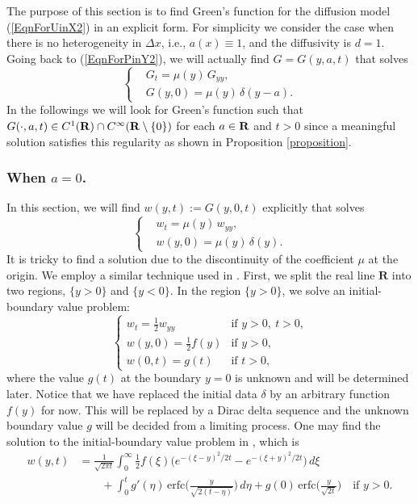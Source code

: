 \documentclass[11pt]{amsart}
\def\R{{\bf R}}
\def\d{d}
\def\R{{\bf R}}
\def\bfR{{\bf R}}
\def\erfc{\mathrm{erfc}}
\begin{document}
The purpose of this section is to find Green's function for the diffusion model (\ref{EqnForUinX2}) in an explicit form. For simplicity we consider the case when there is no heterogeneity in $\Delta x$, i.e., $a(x)\equiv 1$, and the diffusivity is $\d=1$. Going back to (\ref{EqnForPinY2}), we will actually find  $G=G(y,a,t)$ that solves
\[\left\{
\begin{aligned}
&G_t= \mu(y) \,G_{yy},\\
&G(y,0)=\mu(y) \,\delta(y-a).
\end{aligned}
\right.\]
In the followings we will look for Green's function such that $G(\cdot,a,t)\in C^1(\R)\cap C^\infty(\R\setminus\{0\})$ for each $a\in\bfR$ and $t>0$ since a meaningful solution satisfies this regularity as shown in Proposition \ref{proposition}.


\subsubsection{When $a=0$.}
In this section, we will find $w(y,t):=G(y,0,t)$ explicitly that solves
\begin{equation}\label{w0}
\left\{
\begin{aligned}
&w_t= \mu(y) \,w_{yy},\\
&w(y,0)=\mu(y) \,\delta(y).
\end{aligned}
\right.
\end{equation}
It is tricky to find a solution due to the discontinuity of the coefficient $\mu$ at the origin. We employ a similar technique used in \cite{Chung20142520}. First, we split the real line $\textbf{R}$ into two regions, $\{ y>0 \}$ and $\{ y<0 \}$. In the region $\{y>0\}$, we solve an initial-boundary value problem:
\[
\begin{cases}
w_t = \frac{1}{2} w_{yy} & \text{if $y > 0, ~t > 0$,} \\
w(y,0) = \frac{1}{2} f(y) & \text{if $y > 0$,} \\
w(0,t) = g(t) & \text{if $t > 0$,}
\end{cases}
\]
where the value $g(t)$ at the boundary $y=0$ is unknown and will be determined later. Notice that we have replaced the initial data $\delta$ by an arbitrary function $f(y)$ for now. This will be replaced by a Dirac delta sequence and the unknown boundary value $g$ will be decided from a limiting process. One may find the solution to the initial-boundary value problem in \cite[p18 and p22]{MR1728947}, which is
\[ \begin{split}
w(y,t) &= \frac{1}{\sqrt{2 \pi t}} \int_0^\infty \frac{1}{2} f(\xi) \big( e^{-(\xi-y)^2/2t} - e^{-(\xi+y)^2/2t} \big)\,d\xi \\
& \qquad + \int_0^t g'(\eta) \,\erfc\Big( \frac{y}{\sqrt{2(t-\eta)}} \Big) \,d\eta + g(0) \,\erfc\Big( \frac{y}{\sqrt{2t}} \Big) \quad \text{if $y > 0$.}
\end{split} \]
\end{document}
